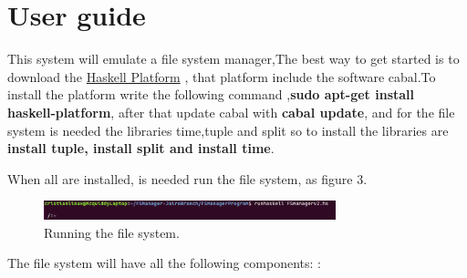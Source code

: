 \documentclass{aes2e}
\begin{document}
\section{User guide}
This system will emulate a file system manager,The best way to get started is to download the \underline{Haskell Platform} \cite{DEK6}, that platform include the software cabal.To install the platform write the following command ,\textbf{sudo apt-get install haskell-platform}, after that update cabal with \textbf{cabal update}, and for the file system is needed the libraries time,tuple and split so to install the libraries are \textbf{install tuple, install split and install time}.\newline

When all are installed, is needed run the file system, as  figure 3.
\begin{figure}[ht]
\centering
\includegraphics[width=20pc]{run_haskell.png}
\caption{Running the file system.}
\end{figure}

The file system will have all the following components: : 
\begin{table}

\end{table}
\end{document}
